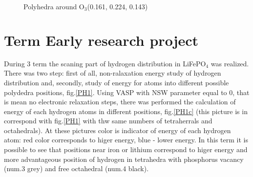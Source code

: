 \documentclass[11pt]{article}
\begin{document}
\begin{figure}[H]
\begin{minipage}[h]{0.5\linewidth}
\end{minipage}
\hfill
\begin{minipage}[h]{0.5\linewidth}
\end{minipage}
\caption{ Polyhedra around O$_3$(0.161, 0.224, 0.143) }
\label{PH3}
\end{figure}


\newpage

\section{Term Early research project}

During 3 term the scaning part of hydrogen distribution in LiFePO$_4$ was realized. There was two step: first of all, non-ralaxation energy study of hydrogen distribution and, secondly, study of energy for atoms into different possible polydedra positions,  fig.\ref{PH1}. Using VASP with NSW parameter equal to 0, that is mean no electronic relaxation steps, there was performed the calculation of energy of each hydrogen atoms in different positions, fig.\ref{PH1c} (this picture is in correspond with  fig.\ref{PH1} with thw same numbers of tetraherrals and octahedrals). At these pictures color is indicator of energy of each hydrogen atom: red color corresponds to higer energy, blue - lower energy. In this term it is possible to see that positions near iron or lithium correspond to higer energy and more advantageous position of hydrogen in tetrahedra with phosphorus vacancy (num.3 grey) and free octahedral (num.4 black).
\end{document}
